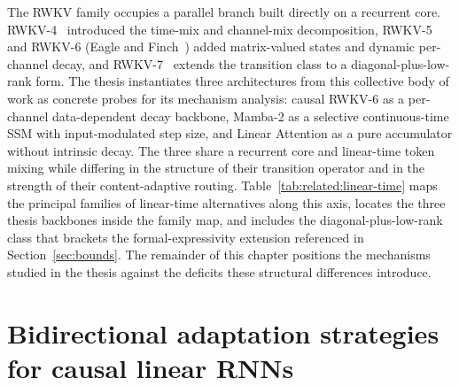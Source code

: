 The RWKV family occupies a parallel branch built directly on a
recurrent core. RWKV-4~\cite{peng2023rwkv} introduced the
time-mix and channel-mix decomposition, RWKV-5 and RWKV-6 (Eagle
and Finch~\cite{peng2024eaglefinch}) added matrix-valued states
and dynamic per-channel decay, and RWKV-7~\cite{peng2025rwkv7}
extends the transition class to a diagonal-plus-low-rank form.
The thesis instantiates three architectures from this collective
body of work as concrete probes for its mechanism analysis:
causal RWKV-6 as a per-channel data-dependent decay backbone,
Mamba-2 as a selective continuous-time SSM with input-modulated
step size, and Linear Attention as a pure accumulator without
intrinsic decay. The three share a recurrent core and linear-time
token mixing while differing in the structure of their transition
operator and in the strength of their content-adaptive routing.
Table~\ref{tab:related:linear-time} maps the principal families
of linear-time alternatives along this axis, locates the three
thesis backbones inside the family map, and includes the
diagonal-plus-low-rank class that brackets the formal-expressivity
extension referenced in Section~\ref{sec:bounds}. The remainder of
this chapter positions the mechanisms studied in the thesis
against the deficits these structural differences introduce.

\section{Bidirectional adaptation strategies for causal linear RNNs}

